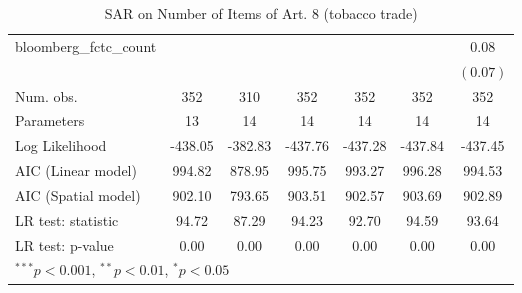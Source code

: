 \begin{table}[!h]
\begin{center}
\begin{tabular}{l c c c c c c }
bloomberg\_fctc\_count  &              &              &              &              &              & $0.08$       \\
                        &              &              &              &              &              & $(0.07)$     \\
\midrule
Num. obs.               & 352          & 310          & 352          & 352          & 352          & 352          \\
Parameters              & 13           & 14           & 14           & 14           & 14           & 14           \\
Log Likelihood          & -438.05      & -382.83      & -437.76      & -437.28      & -437.84      & -437.45      \\
AIC (Linear model)      & 994.82       & 878.95       & 995.75       & 993.27       & 996.28       & 994.53       \\
AIC (Spatial model)     & 902.10       & 793.65       & 903.51       & 902.57       & 903.69       & 902.89       \\
LR test: statistic      & 94.72        & 87.29        & 94.23        & 92.70        & 94.59        & 93.64        \\
LR test: p-value        & 0.00         & 0.00         & 0.00         & 0.00         & 0.00         & 0.00         \\
\bottomrule
\multicolumn{7}{l}{\scriptsize{$^{***}p<0.001$, $^{**}p<0.01$, $^*p<0.05$}}
\end{tabular}
\caption{SAR on Number of Items of Art. 8 (tobacco trade)}
\label{table:coefficients}
\end{center}
\end{table}
